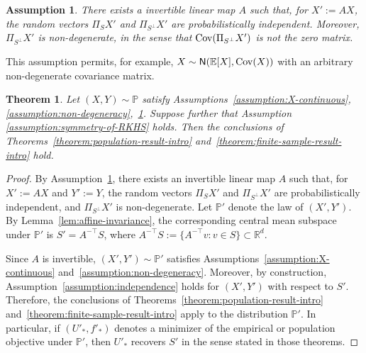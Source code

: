\documentclass[sn-mathphys-num]{sn-jnl}%
\numberwithin{equation}{section}
\newcommand{\E}{\mathbb{E}}
\newcommand{\normal}{\mathsf{N}}  %
\renewcommand{\P}{\mathbb{P}}
\newtheorem{assumption}{Assumption}[section]
\newcommand{\Cov}{{\rm Cov}}
\theoremstyle{thmstyleone}%
\newtheorem{theorem}{Theorem}%
\theoremstyle{thmstyletwo}%
\theoremstyle{thmstylethree}%
\begin{document}
\vspace{.5em} 
\begin{assumption}
\label{assumption:independence-new}
There exists a invertible linear map $A$ such that, for
$X' := AX$, the random vectors $\Pi_S X'$ and $\Pi_{S^\perp} X'$ are
probabilistically independent. Moreover, $\Pi_{S^\perp} X'$ is
non-degenerate, in the sense that $\Cov(\Pi_{S^\perp} X')$ is not the zero matrix.
\end{assumption} 

\vspace{.5em}
This assumption permits, for example,
$X \sim \normal(\E[X], \Cov(X))$ with an arbitrary non-degenerate covariance
matrix.




\vspace{.5em}

\begin{theorem}
\label{theorem:dependence}
Let $(X, Y) \sim \P$ satisfy Assumptions~\ref{assumption:X-continuous},
\ref{assumption:non-degeneracy},~\ref{assumption:independence-new}. Suppose 
further that Assumption
\ref{assumption:symmetry-of-RKHS} holds. Then the conclusions of
Theorems~\ref{theorem:population-result-intro} and~\ref{theorem:finite-sample-result-intro}  hold.
\end{theorem}

\begin{proof} 
By Assumption~\ref{assumption:independence-new}, there exists an invertible
linear map $A$ such that, for $X' := AX$ and $Y' := Y$, the random vectors
$\Pi_S X'$ and $\Pi_{S^\perp} X'$ are probabilistically independent, and
$\Pi_{S^\perp} X'$ is non-degenerate. Let $\P'$ denote the law of $(X',Y')$.
By Lemma~\ref{lem:affine-invariance}, the corresponding central mean subspace
under $\P'$ is $S' = A^{-\top} S$, where $A^{-\top} S := \{ A^{-\top} v : v \in S \} \subset \mathbb{R}^d$.

Since $A$ is invertible, $(X',Y') \sim \P'$ satisfies
Assumptions~\ref{assumption:X-continuous} and~\ref{assumption:non-degeneracy}.
Moreover, by construction,
Assumption~\ref{assumption:independence} holds for $(X',Y')$ with respect to
$S'$. Therefore, the conclusions of
Theorems~\ref{theorem:population-result-intro}
and~\ref{theorem:finite-sample-result-intro} apply to the distribution $\P'$. In particular, 
if $(U'_*, f'_*)$ denotes a minimizer of the empirical or population objective under $\P'$, 
then $U'_*$ recovers $S'$ in the sense stated in those theorems.
\end{proof} 
\end{document}
